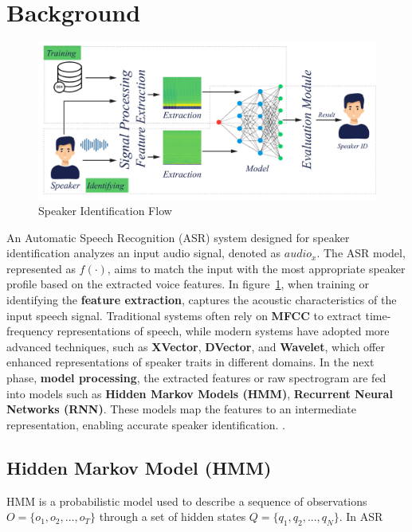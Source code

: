 \documentclass[conference]{IEEEtran}
\begin{document}
\section{Background}


\begin{figure}[H]
    \centering
    \begin{minipage}{0.5\textwidth}
        \centering
        \includegraphics[width=1\textwidth]{resource/img/identification_flow.pdf}
        \caption{Speaker Identification Flow}
        \label{fig:identification_flow}
    \end{minipage}

\end{figure}


An Automatic Speech Recognition (ASR) system designed for speaker identification analyzes an input audio signal, denoted as $audio_x$.
The ASR model, represented as $f(\cdot)$, aims to match the input with the most appropriate speaker profile based on the extracted voice features.
In figure~\ref{fig:identification_flow}, when training or identifying the \textbf{feature extraction},
captures the acoustic characteristics of the input speech signal. Traditional systems often rely on \textbf{MFCC} to extract time-frequency representations of speech,
while modern systems have adopted more advanced techniques, such as \textbf{XVector}, \textbf{DVector}, and \textbf{Wavelet}, which offer enhanced representations of
speaker traits in different domains. In the next phase, \textbf{model processing}, the extracted features or raw spectrogram are fed into models such as \textbf{Hidden Markov Models (HMM)},
\textbf{Recurrent Neural Networks (RNN)}. These models map the features to an intermediate representation,
enabling accurate speaker identification. \cite{davis1980comparison, Snyder2018Xvectors,wan2018dvector,graves2013speech}.



\subsection{Hidden Markov Model (HMM)}
HMM is a probabilistic model used to describe a sequence of observations $O = \{o_1, o_2, ..., o_T\}$ through a set of hidden states $Q = \{q_1, q_2, ..., q_N\}$. In ASR
\end{document}
